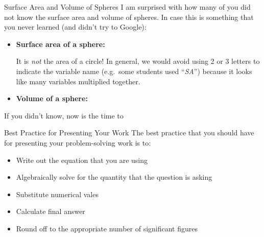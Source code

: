 \documentclass[12pt,compress,aspectratio=169]{beamer}
\begin{document}
%    



\begin{frame}{Surface Area and Volume of Spheres}
  I am surprised with how many of you did not know the surface area and
  volume of spheres. In case this is something that you never learned (and
  didn't try to Google):
  \begin{itemize}
  \item\textbf{Surface area of a sphere:}


    \vspace{-.2in}It is \emph{not} the area of a circle! In general,
    we would avoid using 2 or 3 letters to indicate the variable name (e.g.\
    some students used ``\emph{SA}'') because it looks like many variables
    multiplied together.

  \item\textbf{Volume of a sphere:}

  \end{itemize}
  If you didn't know, now is the time to 
\end{frame}



\begin{frame}{Best Practice for Presenting Your Work}
  The best practice that you should have for presenting your problem-solving
  work is to:
  \begin{itemize}
  \item Write out the equation that you are using
  \item Algebraically solve for the quantity that the question is asking
  \item Substitute numerical vales
  \item  Calculate final answer
  \item Round off to the appropriate number of significant figures
  \end{itemize}
\end{frame}
\end{document}
